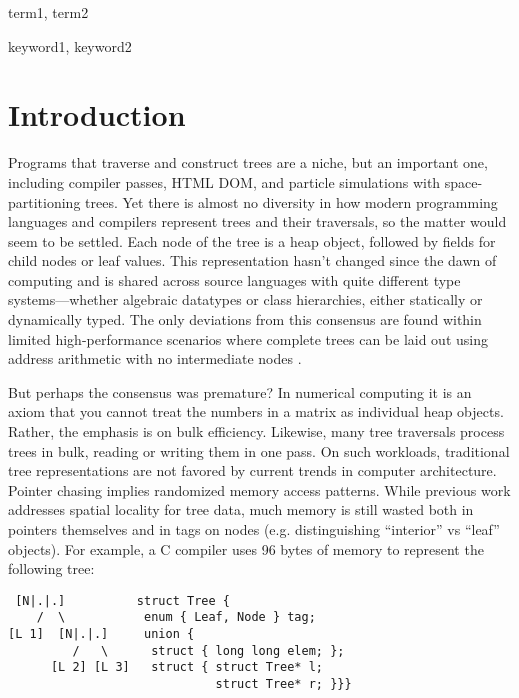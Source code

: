 \documentclass[preprint,10pt,nocopyrightspace,nonatbib]{./bibs/sigplanconf}
\begin{document}
\terms
term1, term2

\keywords
keyword1, keyword2

\section{Introduction}


Programs that traverse and construct trees are a niche, but an important one,
including compiler passes, HTML DOM, and particle simulations with
space-partitioning trees.
%
Yet there is almost no diversity in how modern programming languages and
compilers represent trees and their traversals, so the matter would seem to be
settled.
Each node of the tree is a heap object, followed by fields for child nodes or
leaf values.  This representation hasn't changed since the dawn of computing and
is shared across source languages with quite different type
systems---whether algebraic datatypes or class hierarchies, either statically or
dynamically typed.  The only deviations from this consensus are found within
limited high-performance scenarios where complete trees can be laid out using
address arithmetic with no intermediate nodes \cite{hpc-trees}.

But perhaps the consensus was premature?  In numerical computing it is an axiom
that you cannot treat the numbers in a matrix as individual heap objects.
Rather, the emphasis is on bulk efficiency.  Likewise, many tree traversals
process trees in bulk, reading or writing them in one pass.  On such workloads,
traditional tree representations are not favored by current trends in computer
architecture.  Pointer chasing implies randomized memory access patterns.
%
While previous work addresses spatial locality for tree data\cite{tree-locality-pldi},
%
much memory is still wasted both in pointers themselves and in tags on nodes
(e.g. distinguishing ``interior'' vs ``leaf'' objects).  For example, a C
compiler uses 96 bytes
%
%
of memory to represent the following tree:  

\begin{verbatim}
 [N|.|.]          struct Tree {
    /  \           enum { Leaf, Node } tag;
[L 1]  [N|.|.]     union { 
         /   \      struct { long long elem; };
      [L 2] [L 3]   struct { struct Tree* l;
                             struct Tree* r; }}}
\end{verbatim}
\end{document}
